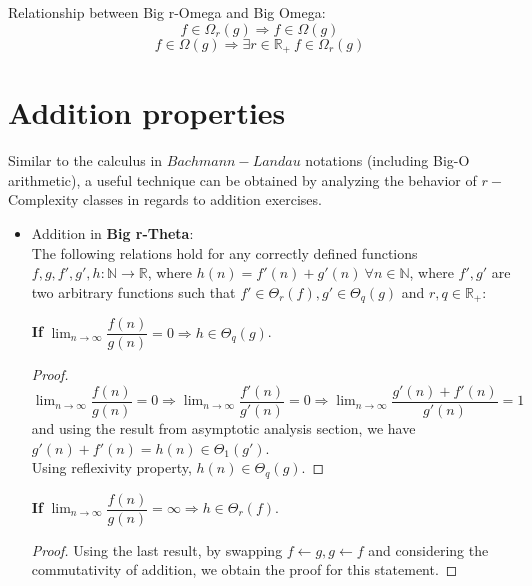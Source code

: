 \begin{theorem}
    Relationship between Big r-Omega and Big Omega:
    \[  f \in \Omega_{r}(g) \Rightarrow f \in \Omega (g) \]
    \[  f \in \Omega(g) \Rightarrow \exists r \in \mathbb{R}_{+}\ f \in \Omega_{r}(g) \]
\end{theorem}


\section{Addition properties}
Similar to the calculus in $Bachmann-Landau$ notations (including Big-O arithmetic), a useful technique can be obtained by analyzing the behavior of $r-$Complexity classes in regards to addition exercises.



\begin{itemize}
    \item Addition in \textbf{Big r-Theta}:  \\
    The following relations hold for any correctly defined functions $f, g, f', g', h:\mathbb{N}\longrightarrow\mathbb{R}$, where $ h(n) = f'(n) + g'(n)\  \forall n \in  \mathbb{N} $, where $f',g'$ are two arbitrary functions such that $ f' \in \Theta_{r}(f), g' \in \Theta_{q}(g) $ and $r,q \in \mathbb{R}_{+}$:
    \begin{theorem}
        \textbf{If} $ \lim_{n\to\infty} \dfrac{f(n)}{g(n)} = 0 \Rightarrow  h \in \Theta_{q}(g) $. \\
    \end{theorem}
    \begin{proof}
        $ \lim_{n\to\infty} \dfrac{f(n)}{g(n)} = 0 \Rightarrow \lim_{n\to\infty} \dfrac{f'(n)}{g'(n)} = 0 \Rightarrow \lim_{n\to\infty} \dfrac{g'(n) + f'(n)}{g'(n)} = 1 $ and using the result from asymptotic analysis section, we have $ g'(n) + f'(n) = h(n) \in \Theta_{1}(g')$. \\ Using reflexivity property, $ h(n) \in \Theta_{q}(g)$.
    \end{proof}

    \begin{theorem}
        \textbf{If} $ \lim_{n\to\infty} \dfrac{f(n)}{g(n)} = \infty \Rightarrow  h \in \Theta_{r}(f) $. \\
    \end{theorem}
    \begin{proof}
        Using the last result, by swapping $f \leftarrow g, g \leftarrow f$ and considering the commutativity of addition, we obtain the proof for this statement.
    \end{proof}



\end{itemize}
